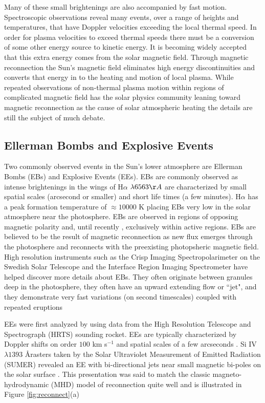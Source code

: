 \documentclass[]{aastex6}
\begin{document}
	Many of these small brightenings are also accompanied by fast motion.  Spectroscopic observations reveal many events, over a range of heights and temperatures, that have Doppler velocities exceeding the local thermal speed.  In order for plasma velocities to exceed  thermal speeds there must be a conversion of some other energy source to kinetic energy. It is becoming widely accepted that this extra energy comes from the solar magnetic field.  Through magnetic reconnection the Sun's magnetic field eliminates high energy discontinuities and converts that energy in to the heating and motion of local plasma.  While repeated observations of non-thermal plasma motion within regions of complicated magnetic field has the solar physics community leaning toward magnetic reconnection as the cause of solar atmospheric heating the details are still the subject of much debate.	

	\subsection{Ellerman Bombs and Explosive Events}
	
	Two commonly observed events in the Sun's lower atmosphere are Ellerman Bombs (EBs) and Explosive Events (EEs). EBs \citep{Ellerman1917} are commonly observed as intense brightenings in the wings of H$\alpha$ $\lambda 6563 \AA $ are characterized by small spatial scales (arcsecond or smaller) and short life times (a few minutes). H$\alpha$ has a peak formation temperature of $\approx 10000$ K placing EBs very low in the solar atmosphere near the photosphere. EBs are observed in regions of opposing magnetic polarity and, until recently \citep{Nelson2017}, exclusively within active regions.  EBs are believed to be the result of magnetic reconnection as new flux emerges through the photosphere and reconnects with the preexisting photopsheric magnetic field.  High resolution instruments such as the Crisp Imaging Spectropolarimeter \citep[CHRISP;][]{CHRISP} on the Swedish Solar Telescope \citep[SST;][]{SST} and the Interface Region Imaging Spectrometer \citep[IRIS;][]{IRIS} have helped discover more details about EBs.  They often originate between granules deep in the photosphere, they often have an upward extending flow or ``jet", and they demonstrate very fast variations (on second timescales) coupled with repeated eruptions \citep{Watanabe2011,Vissers2013,Vissers2015}
	
	
	
	EEs were first analyzed by \citet{Brueckner1983} using data from the High Resolution Telescope and Spectrograph (HRTS) sounding rocket. EEs are typically characterized by Doppler shifts on order $100$ km s$^{-1}$ and spatial scales of a few arcseconds \citep{Dere1989,Dere1994}.  Si IV $\lambda 1393$ \AA rasters taken by the Solar Ultraviolet Measurement of Emitted Radiation (SUMER) revealed an EE with bi-directional jets near small magnetic bi-poles on the solar surface \citep{Innes1997}.  This presentation was said to match the classic magneto-hydrodynamic (MHD) model of reconnection \citep{Petschek1964} quite well and is illustrated in Figure \ref{fig:reconnect}(a)
	
\end{document}
